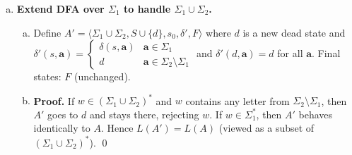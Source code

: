 \begin{enumerate}[{5.}1. ]
\begin{enumerate}[(a)]
\begin{enumerate}[(a)]
  $L_1/L_2=\{x\mid\exists y\in L_2\ni xy\in L_1\}$.
  $F^{^/}=\{t\in S_1\mid\exists y\in\Sigma^*\ni y\in L_2\wedge\DBAR_1(t,y)\in F_1\}$.

  \begin{proof}
  $x\in L(A^{^/})$ iff $\DBAR_1(s_{0_1},x)\in F^{^/}$
  iff $\exists y\in L_2\ni\DBAR_1(\DBAR_1(s_{0_1},x),y)\in F_1$
  iff $\exists y\in L_2\ni\DBAR_1(s_{0_1},xy)\in F_1$
  iff $\exists y\in L_2\ni xy\in L_1$
  iff $x\in L_1/L_2$. \qed
  \end{proof}

  \item \textbf{Algorithm to compute $F^{^/}$.}

  For each state $t\in S_1$, determine whether $\exists y\in L_2\ni\DBAR_1(t,y)\in F_1$:
  \begin{enumerate}[1.]
    \item Build the product machine $A_1\times A_2$: state set $S_1\times S_2$, start at $\langle t,s_{0_2}\rangle$ for each $t$.
    \item In this product, run $A_2$ on the input and simultaneously advance $A_1$.
    \item State $t\in F^{^/}$ iff some state $\langle f_1,f_2\rangle$ with $f_1\in F_1$ and $f_2\in F_2$ is reachable from $\langle t,s_{0_2}\rangle$ in the product.
  \end{enumerate}
  This is a reachability computation in a finite graph, computable in $O(|S_1|\cdot|S_2|)$ time.
\end{enumerate}

\item \textbf{Extend DFA over $\Sigma_1$ to handle $\Sigma_1\cup\Sigma_2$.}

\begin{enumerate}[(a)]
  \item Define $A'=\langle\Sigma_1\cup\Sigma_2,S\cup\{d\},s_0,\delta',F\rangle$ where $d$ is a new dead state and
  $\delta'(s,\pmb{a})=\begin{cases}\delta(s,\pmb{a}) & \pmb{a}\in\Sigma_1 \\ d & \pmb{a}\in\Sigma_2\setminus\Sigma_1\end{cases}$
  and $\delta'(d,\pmb{a})=d$ for all $\pmb{a}$.  Final states: $F$ (unchanged).

  \item \textbf{Proof.}  If $w\in(\Sigma_1\cup\Sigma_2)^*$ and $w$ contains any letter from $\Sigma_2\setminus\Sigma_1$, then $A'$ goes to $d$ and stays there, rejecting $w$.  If $w\in\Sigma_1^*$, then $A'$ behaves identically to $A$.  Hence $L(A')=L(A)$ (viewed as a subset of $(\Sigma_1\cup\Sigma_2)^*$). \qed
\end{enumerate}


\end{enumerate}
\end{enumerate}
